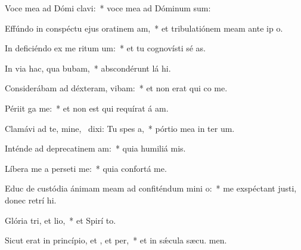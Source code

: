 \item Voce mea ad Dómi clavi:~* voce mea ad Dóminum  sum:
\item Effúndo in conspéctu ejus oratinem am,~* et tribulatiónem meam ante ip o.
\item In deficiéndo ex me ritum um:~* et tu cognovísti sé as.
\item In via hac, qua bubam,~* abscondérunt lá hi.
\item Considerábam ad déxteram,  vibam:~* et non erat qui co me.
\item Périit ga  me:~* et non est qui requírat á am.
\item Clamávi ad te, mine,~\pscross{} dixi: Tu  spes a,~* pórtio mea in ter um.
\item Inténde ad deprecatinem am:~* quia humiliá  mis.
\item Líbera me a perseti me:~* quia confortá   me.
\item Educ de custódia ánimam meam ad confiténdum mini o:~* me exspéctant justi, donec retrí hi.
\item Glória tri, et lio,~* et Spirí to.
\item Sicut erat in princípio, et , et per,~* et in sǽcula sæcu. men.
